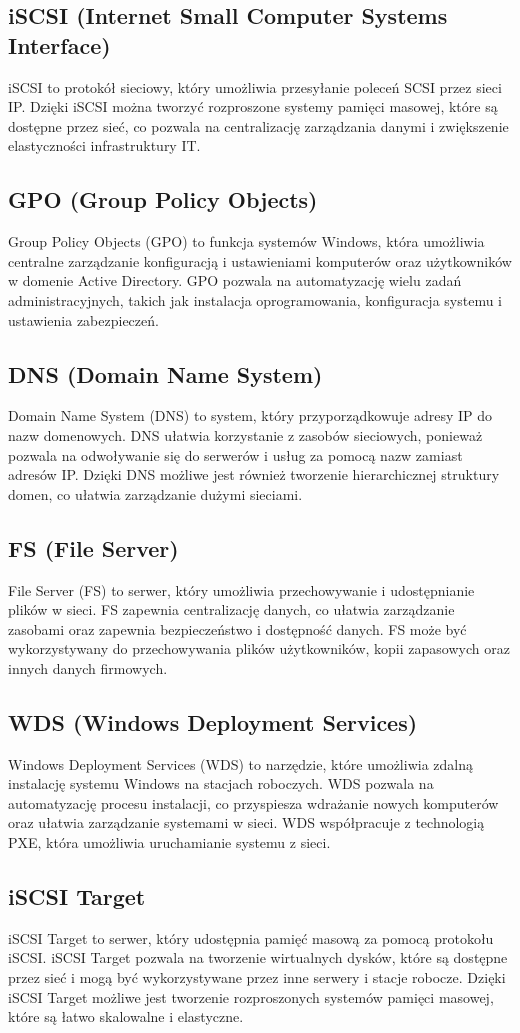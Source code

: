 \subsection{iSCSI (Internet Small Computer Systems Interface)}
iSCSI to protokół sieciowy, który umożliwia przesyłanie poleceń SCSI przez sieci IP. Dzięki iSCSI można tworzyć rozproszone systemy pamięci masowej, które są dostępne przez sieć, co pozwala na centralizację zarządzania danymi i zwiększenie elastyczności infrastruktury IT.

\subsection{GPO (Group Policy Objects)}
Group Policy Objects (GPO) to funkcja systemów Windows, która umożliwia centralne zarządzanie konfiguracją i ustawieniami komputerów oraz użytkowników w domenie Active Directory. GPO pozwala na automatyzację wielu zadań administracyjnych, takich jak instalacja oprogramowania, konfiguracja systemu i ustawienia zabezpieczeń.

\subsection{DNS (Domain Name System)}
Domain Name System (DNS) to system, który przyporządkowuje adresy IP do nazw domenowych. DNS ułatwia korzystanie z zasobów sieciowych, ponieważ pozwala na odwoływanie się do serwerów i usług za pomocą nazw zamiast adresów IP. Dzięki DNS możliwe jest również tworzenie hierarchicznej struktury domen, co ułatwia zarządzanie dużymi sieciami.

\subsection{FS (File Server)}
File Server (FS) to serwer, który umożliwia przechowywanie i udostępnianie plików w sieci. FS zapewnia centralizację danych, co ułatwia zarządzanie zasobami oraz zapewnia bezpieczeństwo i dostępność danych. FS może być wykorzystywany do przechowywania plików użytkowników, kopii zapasowych oraz innych danych firmowych.

\subsection{WDS (Windows Deployment Services)}
Windows Deployment Services (WDS) to narzędzie, które umożliwia zdalną instalację systemu Windows na stacjach roboczych. WDS pozwala na automatyzację procesu instalacji, co przyspiesza wdrażanie nowych komputerów oraz ułatwia zarządzanie systemami w sieci. WDS współpracuje z technologią PXE, która umożliwia uruchamianie systemu z sieci.

\subsection{iSCSI Target}
iSCSI Target to serwer, który udostępnia pamięć masową za pomocą protokołu iSCSI. iSCSI Target pozwala na tworzenie wirtualnych dysków, które są dostępne przez sieć i mogą być wykorzystywane przez inne serwery i stacje robocze. Dzięki iSCSI Target możliwe jest tworzenie rozproszonych systemów pamięci masowej, które są łatwo skalowalne i elastyczne. 
